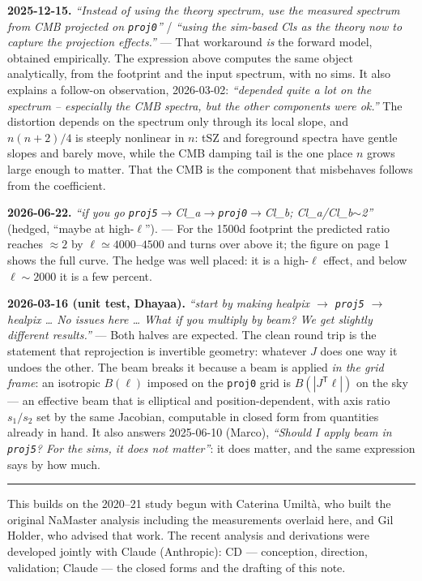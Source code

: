 \documentclass[10pt]{article}
\newcommand{\proj}[1]{\texttt{#1}}
\begin{document}
\vspace{2pt}
\textbf{2025-12-15.}
\emph{``Instead of using the theory spectrum, use the measured spectrum from CMB projected on \proj{proj0}''} / \emph{``using the sim-based Cls as the theory now to capture the projection effects.''}
--- That workaround \emph{is} the forward model, obtained empirically.
The expression above computes the same object analytically, from the footprint and the input spectrum, with no sims.
It also explains a follow-on observation, 2026-03-02: \emph{``depended quite a lot on the spectrum -- especially the CMB spectra, but the other components were ok.''}
The distortion depends on the spectrum only through its local slope, and $n(n+2)/4$ is steeply nonlinear in $n$: tSZ and foreground spectra have gentle slopes and barely move, while the CMB damping tail is the one place $n$ grows large enough to matter.
That the CMB is the component that misbehaves follows from the coefficient.

\vspace{2pt}
\textbf{2026-06-22.}
\emph{``if you go \proj{proj5}$\to$Cl\_a$\to$\proj{proj0}$\to$Cl\_b; Cl\_a/Cl\_b$\sim$2''} (hedged, ``maybe at high-$\ell$'').
--- For the 1500d footprint the predicted ratio reaches $\approx2$ by $\ell\simeq4000$--$4500$ and turns over above it; the figure on page 1 shows the full curve.
The hedge was well placed: it is a high-$\ell$ effect, and below $\ell\sim2000$ it is a few percent.

\vspace{2pt}
\textbf{2026-03-16 (unit test, Dhayaa).}
\emph{``start by making healpix $\to$ \proj{proj5} $\to$ healpix \ldots{} No issues here \ldots{} What if you multiply by beam? We get slightly different results.''}
--- Both halves are expected.
The clean round trip is the statement that reprojection is invertible geometry: whatever $J$ does one way it undoes the other.
The beam breaks it because a beam is applied \emph{in the grid frame}: an isotropic $B(\ell)$ imposed on the \proj{proj0} grid is $B(|J^{\mathsf T}\boldsymbol\ell|)$ on the sky --- an effective beam that is elliptical and position-dependent, with axis ratio $s_1/s_2$ set by the same Jacobian, computable in closed form from quantities already in hand.
It also answers 2025-06-10 (Marco), \emph{``Should I apply beam in \proj{proj5}? For the sims, it does not matter''}: it does matter, and the same expression says by how much.

\vspace{6pt}\hrule\vspace{3pt}
{\footnotesize This builds on the 2020--21 study begun with Caterina Umilt\`a, who built the original NaMaster analysis including the measurements overlaid here, and Gil Holder, who advised that work.
The recent analysis and derivations were developed jointly with Claude (Anthropic): CD --- conception, direction, validation; Claude --- the closed forms and the drafting of this note.\par}
\end{document}
